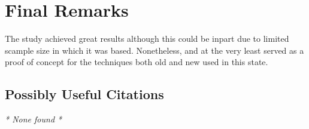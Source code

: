 \documentclass{Paper_Summary}
\begin{document}
\section{Final Remarks}
    
    The study achieved great results although this could be inpart due to limited scample size in which it was based. Nonetheless, and at the very least served as a proof of concept for the techniques both old and new used in this state.

\breakline

\begin{center}
    \section*{Possibly Useful Citations}
\end{center}
    \emph{* None found *}
\end{document}
